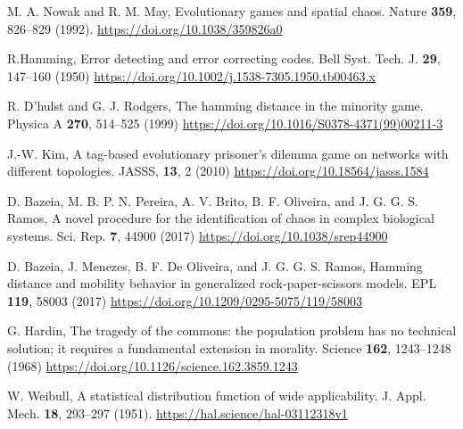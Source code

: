 \begin{thebibliography}{04}



M. A. Nowak and R. M. May,
Evolutionary games and spatial chaos. 
Nature \textbf{359}, 826--829 (1992).
\url{https://doi.org/10.1038/359826a0}

\raggedright
R.Hamming,
Error detecting and error correcting codes.
Bell Syst. Tech. J. \textbf{29}, 147--160 
(1950)
\url{https://doi.org/10.1002/j.1538-7305.1950.tb00463.x}


\raggedright
R. D'hulst and G. J. Rodgers,
The hamming distance in the minority game.
Physica A \textbf{270}, 514--525 (1999) 
\url{https://doi.org/10.1016/S0378-4371(99)00211-3}

\raggedright
J.-W. Kim,
A tag-based evolutionary prisoner's dilemma game on networks with different topologies.
JASSS, \textbf{13}, 2 (2010)
\url{https://doi.org/10.18564/jasss.1584}

\raggedright
D. Bazeia, M. B. P. N. Pereira, A. V. Brito, B. F. Oliveira, and J. G. G. S. Ramos,
A novel procedure for the identification of chaos in complex biological systems.
Sci. Rep. \textbf{7}, 44900 (2017)
\url{https://doi.org/10.1038/srep44900}

\raggedright
D. Bazeia, J. Menezes, B. F. De Oliveira, and J. G. G. S. Ramos,
Hamming distance and mobility behavior in generalized rock-paper-scissors models.
EPL \textbf{119}, 58003 (2017)
\url{https://doi.org/10.1209/0295-5075/119/58003}

\raggedright
G. Hardin,
The tragedy of the commons: the population problem has no technical solution; it requires a fundamental extension in morality.
Science \textbf{162}, 1243--1248 (1968)
\url{https://doi.org/10.1126/science.162.3859.1243}


\raggedright
W. Weibull, A statistical distribution function of wide applicability.
J. Appl. Mech. \textbf{18}, 293--297 (1951).
\url{https://hal.science/hal-03112318v1}

\end{thebibliography}
